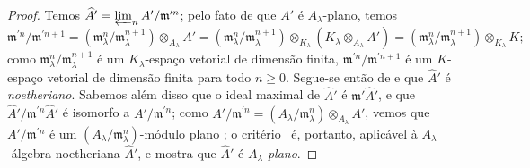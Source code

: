 \begin{proof}
Temos $\widehat{A}'=\varprojlim_n A'/\mathfrak{m}^{\prime n}$;
pelo fato de que $A'$ é $A_\lambda$-plano, temos
\[
  \mathfrak{m}^{\prime n}/\mathfrak{m}^{\prime n+1}=(\mathfrak{m}_\lambda^{n}/\mathfrak{m}_\lambda^{n+1})\otimes_{A_\lambda}A'=(\mathfrak{m}_\lambda^{n}/\mathfrak{m}_\lambda^{n+1})\otimes_{K_\lambda}(K_\lambda\otimes_{A_\lambda}A')=(\mathfrak{m}_\lambda^{n}/\mathfrak{m}_\lambda^{n+1})\otimes_{K_\lambda}K;
\]
como $\mathfrak{m}_\lambda^{n}/\mathfrak{m}_\lambda^{n+1}$ é um $K_\lambda$-espaço vetorial de dimensão finita, $\mathfrak{m}^{\prime n}/\mathfrak{m}^{\prime n+1}$ é um $K$-espaço vetorial de dimensão finita para todo $n\geq 0$.
Segue-se então de  e  que $\widehat{A}'$ é \emph{noetheriano}.
Sabemos além disso que o ideal maximal de $\widehat{A}'$ é $\mathfrak{m}'\widehat{A}'$, e que $\widehat{A}'/\mathfrak{m}^{\prime n}\widehat{A}'$ é isomorfo a $A'/\mathfrak{m}^{\prime n}$;
como $A'/\mathfrak{m}^{\prime n}=(A_\lambda/\mathfrak{m}_\lambda^n)\otimes_{A_\lambda}A'$, vemos que $A'/\mathfrak{m}^{\prime n}$ é um $(A_\lambda/\mathfrak{m}_\lambda^n)$-módulo plano ;
o critério~ é, portanto, aplicável à $A_\lambda$-álgebra noetheriana $\widehat{A}'$, e mostra que $\widehat{A}'$ é \emph{$A_\lambda$-plano}.
\end{proof}

